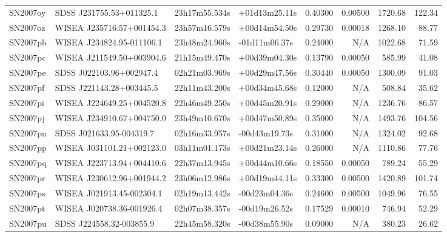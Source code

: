 \begin{longtable}{llllrrrr}
SN2007oy         &        SDSS J231755.53+011325.1 &   23h17m55.534s &   +01d13m25.11s &  0.40300 &  0.00500 &  1720.68 &      122.34 \\
SN2007oz         &       WISEA J235716.57+001454.3 &   23h57m16.579s &   +00d14m54.50s &  0.29730 &  0.00018 &  1268.10 &       88.77 \\
SN2007pb         &       WISEA J234824.95-011106.1 &   23h48m24.960s &   -01d11m06.37s &  0.24000 &      N/A &  1022.68 &       71.59 \\
SN2007pc         &       WISEA J211549.50+003904.6 &   21h15m49.470s &   +00d39m04.30s &  0.13790 &  0.00050 &   585.99 &       41.08 \\
SN2007pe         &        SDSS J022103.96+002947.4 &   02h21m03.969s &   +00d29m47.56s &  0.30440 &  0.00050 &  1300.09 &       91.03 \\
SN2007pf         &        SDSS J221143.28+003445.5 &   22h11m43.200s &   +00d34m45.68s &  0.12000 &      N/A &   508.84 &       35.62 \\
SN2007pi         &       WISEA J224649.25+004520.8 &   22h46m49.250s &   +00d45m20.91s &  0.29000 &      N/A &  1236.76 &       86.57 \\
SN2007pj         &       WISEA J234910.67+004750.0 &   23h49m10.670s &   +00d47m50.89s &  0.35000 &      N/A &  1493.76 &      104.56 \\
SN2007pn         &        SDSS J021633.95-004319.7 &   02h16m33.957s &   -00d43m19.73s &  0.31000 &      N/A &  1324.02 &       92.68 \\
SN2007pp         &       WISEA J031101.21+002123.0 &   03h11m01.173s &   +00d21m23.14s &  0.26000 &      N/A &  1110.86 &       77.76 \\
SN2007pq         &       WISEA J223713.94+004410.6 &   22h37m13.945s &   +00d44m10.66s &  0.18550 &  0.00050 &   789.24 &       55.29 \\
SN2007pr         &       WISEA J230612.96+001944.2 &   23h06m12.986s &   +00d19m44.11s &  0.33300 &  0.00500 &  1420.89 &      101.74 \\
SN2007ps         &       WISEA J021913.45-002304.1 &   02h19m13.442s &   -00d23m04.36s &  0.24600 &  0.00500 &  1049.96 &       76.55 \\
SN2007pt         &       WISEA J020738.36-001926.4 &   02h07m38.357s &   -00d19m26.52s &  0.17529 &  0.00010 &   746.94 &       52.29 \\
SN2007pu         &        SDSS J224558.32-003855.9 &   22h45m58.320s &   -00d38m55.90s &  0.09000 &      N/A &   380.23 &       26.62 \\

\end{longtable}
